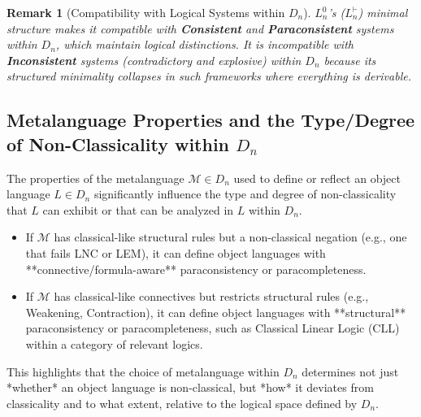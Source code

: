 \documentclass{article}
\newtheorem{remark}{Remark}[section] %
\begin{document}
																																																																							\begin{remark}[Compatibility with Logical Systems within $D_n$]
																																																																								$L^0_n$'s ($L^{\vdash}_n$) minimal structure makes it compatible with \textbf{Consistent} and \textbf{Paraconsistent} systems within $D_n$, which maintain logical distinctions. It is incompatible with \textbf{Inconsistent} systems (contradictory and explosive) within $D_n$ because its structured minimality collapses in such frameworks where everything is derivable.
																																																																								\end{remark}
																																																																									
																																																																									\subsection{Metalanguage Properties and the Type/Degree of Non-Classicality within $D_n$}
																																																																									The properties of the metalanguage $\mathcal{M} \in D_n$ used to define or reflect an object language $L \in D_n$ significantly influence the type and degree of non-classicality that $L$ can exhibit or that can be analyzed in $L$ within $D_n$.
																																																																									\begin{itemize}
																																																																										\item If $\mathcal{M}$ has classical-like structural rules but a non-classical negation (e.g., one that fails LNC or LEM), it can define object languages with **connective/formula-aware** paraconsistency or paracompleteness.
																																																																										\item If $\mathcal{M}$ has classical-like connectives but restricts structural rules (e.g., Weakening, Contraction), it can define object languages with **structural** paraconsistency or paracompleteness, such as Classical Linear Logic (CLL) within a category of relevant logics.
																																																																										\end{itemize}
																																																																											This highlights that the choice of metalanguage within $D_n$ determines not just *whether* an object language is non-classical, but *how* it deviates from classicality and to what extent, relative to the logical space defined by $D_n$.
																																																																											
\end{document}
